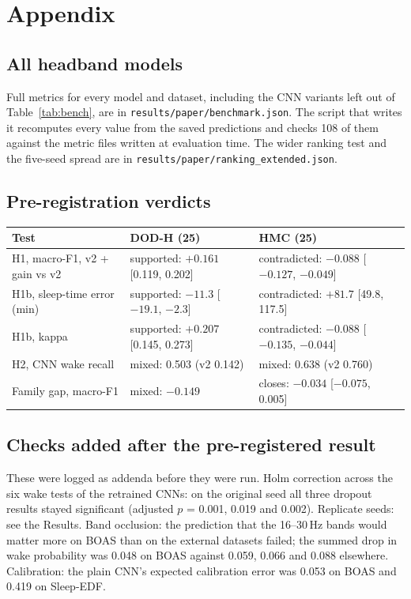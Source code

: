 \documentclass[10pt,twocolumn]{article}
\begin{document}
\onecolumn
\appendix
\section{Appendix}

\subsection{All headband models}
Full metrics for every model and dataset, including the CNN variants left out of
Table~\ref{tab:bench}, are in \texttt{results/paper/benchmark.json}. The script that writes it
recomputes every value from the saved predictions and checks 108 of them against the metric files
written at evaluation time. The wider ranking test and the five-seed spread are in
\texttt{results/paper/ranking\_extended.json}.

\subsection{Pre-registration verdicts}
\begin{center}\small
\begin{tabular}{lll}
\toprule
Test & DOD-H (25) & HMC (25) \\
\midrule
H1, macro-F1, v2 + gain vs v2 & supported: $+0.161$ [0.119, 0.202] & contradicted: $-0.088$ [$-0.127$, $-0.049$] \\
H1b, sleep-time error (min) & supported: $-11.3$ [$-19.1$, $-2.3$] & contradicted: $+81.7$ [49.8, 117.5] \\
H1b, kappa & supported: $+0.207$ [0.145, 0.273] & contradicted: $-0.088$ [$-0.135$, $-0.044$] \\
H2, CNN wake recall & mixed: 0.503 (v2 0.142) & mixed: 0.638 (v2 0.760) \\
Family gap, macro-F1 & mixed: $-0.149$ & closes: $-0.034$ [$-0.075$, 0.005] \\
\bottomrule
\end{tabular}
\end{center}

\subsection{Checks added after the pre-registered result}
These were logged as addenda before they were run. Holm correction across the six wake tests of the
retrained CNNs: on the original seed all three dropout results stayed significant (adjusted $p$ =
0.001, 0.019 and 0.002). Replicate seeds: see the Results. Band occlusion: the prediction that the
16--30\,Hz bands would matter more on BOAS than on the external datasets failed; the summed drop in
wake probability was 0.048 on BOAS against 0.059, 0.066 and 0.088 elsewhere. Calibration: the plain
CNN's expected calibration error was 0.053 on BOAS and 0.419 on Sleep-EDF.
\end{document}
